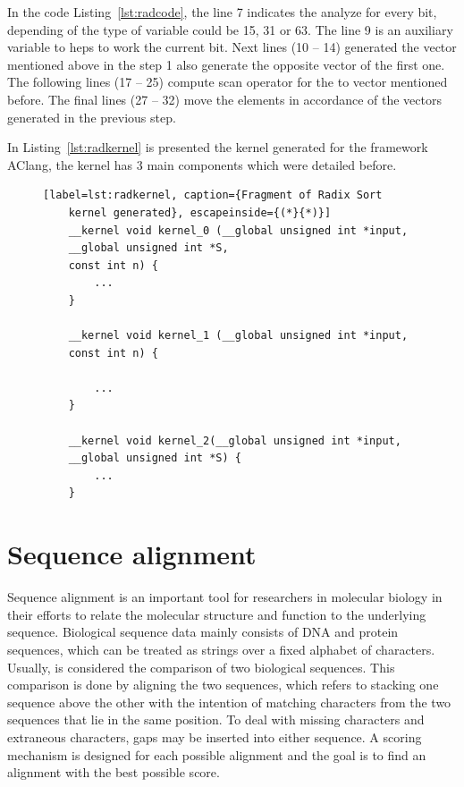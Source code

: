 \documentclass[Ingles]{ic-tese-v1}
\newcommand{\rlst}[1]{Listing~\ref{lst:#1}}
\begin{document}
In the code \rlst{radcode}, the line 7 indicates the analyze for every bit, depending of the
type of variable could be 15, 31 or 63. The line 9 is an auxiliary variable to heps 
to work the current bit. Next lines (10 -- 14) generated the vector mentioned above
in the step 1 also generate the opposite vector of the first one. The following lines
(17 -- 25) compute scan operator for the to vector mentioned before. The final lines
(27 -- 32) move the elements in accordance of the vectors generated in the previous step.

In \rlst{radkernel} is presented the kernel generated for the framework AClang,
the kernel has 3 main components which were detailed before.

\begin{figure}[t]
	\lstset{basicstyle=\scriptsize}
	\begin{lstlisting}[label=lst:radkernel, caption={Fragment of Radix Sort
	kernel generated}, escapeinside={(*}{*)}]
	__kernel void kernel_0 (__global unsigned int *input,
	__global unsigned int *S,
	const int n) {
		...
	}
	
	__kernel void kernel_1 (__global unsigned int *input,
	const int n) {
	
		...
	}
	
	__kernel void kernel_2(__global unsigned int *input,
	__global unsigned int *S) {
		...
	}
	\end{lstlisting}
\end{figure}

\section{Sequence alignment}

Sequence alignment is an important tool for
researchers in molecular biology in their efforts to relate
the molecular structure and function to the underlying
sequence. Biological sequence data mainly consists of
DNA and protein sequences, which can be treated as
strings over a fixed alphabet of characters. Usually,
is considered the comparison of two biological sequences.
This comparison is done by aligning the two sequences,
which refers to stacking one sequence above the other
with the intention of matching characters from the two
sequences that lie in the same position. To deal with
missing characters and extraneous characters, gaps may
be inserted into either sequence. A scoring mechanism is
designed for each possible alignment and the goal is to
find an alignment with the best possible score.
\end{document}

